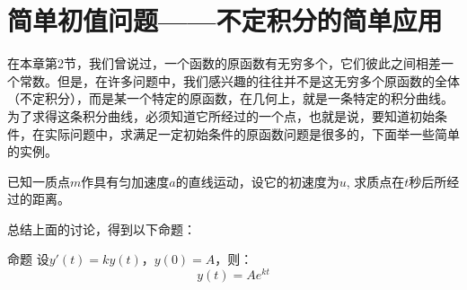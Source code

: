 \begin{example}
    
\end{example}

\begin{solution}
    
\end{solution}



\begin{example}
    
\end{example}

\begin{solution}
    
\end{solution}

\section{简单初值问题——不定积分的简单应用}

在本章第2节，我们曾说过，一个函数的原函数有无穷多个，它们彼此之间相差一个常数。但是，在许多问题中，我们感兴趣的往往并不是这无穷多个原函数的全体（不定积分），而是某一个特定的原函数，在几何上，就是一条特定的积分曲线。为了求得这条积分曲线，必须知道它所经过的一个点，也就是说，要知道初始条件，在实际问题中，求满足一定初始条件的原函数问题是很多的，下面举一些简单的实例。

\begin{example}
    已知一质点$m$作具有匀加速度$a$的直线运动，设它的初速度为$u$, 求质点在$t$秒后所经过的距离。
\end{example}



































总结上面的讨论，得到以下命题：

\begin{blk}{命题}
    设$y'(t)=ky(t)$，$y(0)=A$，则：
    \[y(t)=Ae^{kt}\]
\end{blk}




